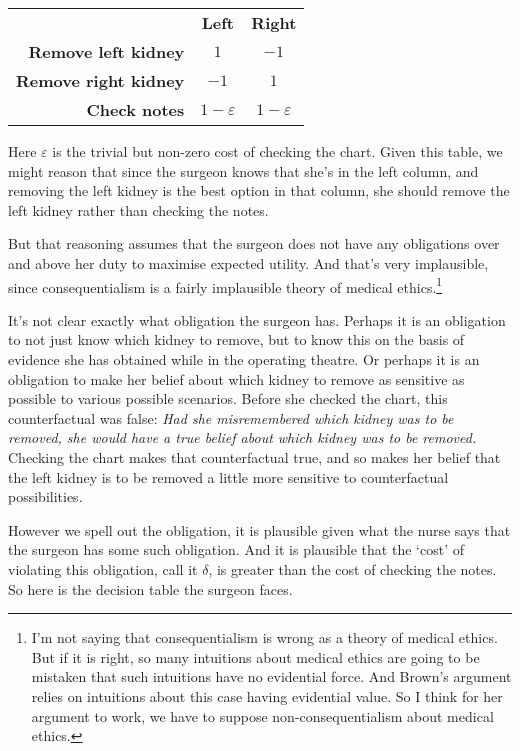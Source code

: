 \begin{center}
\begin{tabular}{r c c}
 & \textbf{Left} & \textbf{Right} \\
\textbf{Remove left kidney} & $1$ & $-1$ \\
\textbf{Remove right kidney} & $-1$ & $1$ \\
\textbf{Check notes} & $1-\varepsilon$ & $1-\varepsilon$ \\
\end{tabular}
\end{center}

\noindent Here $\varepsilon$ is the trivial but non-zero cost of checking the chart. Given this table, we might reason that since the surgeon knows that she's in the left column, and removing the left kidney is the best option in that column, she should remove the left kidney rather than checking the notes.

But that reasoning assumes that the surgeon does not have any obligations over and above her duty to maximise expected utility. And that's very implausible, since consequentialism is a fairly implausible theory of medical ethics.\footnote{I'm not saying that consequentialism is wrong as a theory of medical ethics. But if it is right, so many intuitions about medical ethics are going to be mistaken that such intuitions have no evidential force. And Brown's argument relies on intuitions about this case having evidential value. So I think for her argument to work, we have to suppose non-consequentialism about medical ethics.}

It's not clear exactly what obligation the surgeon has. Perhaps it is an obligation to not just know which kidney to remove, but to know this on the basis of evidence she has obtained while in the operating theatre. Or perhaps it is an obligation to make her belief about which kidney to remove as sensitive as possible to various possible scenarios. Before she checked the chart, this counterfactual was false: \textit{Had she misremembered which kidney was to be removed, she would have a true belief about which kidney was to be removed.} Checking the chart makes that counterfactual true, and so makes her belief that the left kidney is to be removed a little more sensitive to counterfactual possibilities. 

However we spell out the obligation, it is plausible given what the nurse says that the surgeon has some such obligation. And it is plausible that the `cost' of violating this obligation, call it $\delta$, is greater than the cost of checking the notes. So here is the decision table the surgeon faces.


